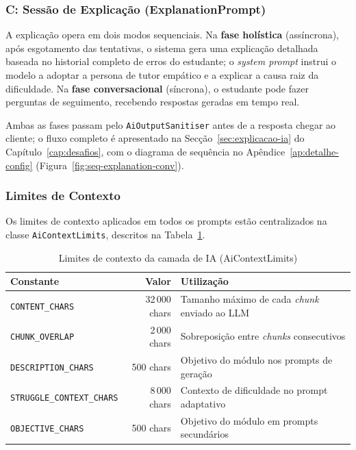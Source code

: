 \subsubsection*{C: Sessão de Explicação (ExplanationPrompt)}

A explicação opera em dois modos sequenciais.
Na \textbf{fase holística} (assíncrona), após esgotamento das tentativas, o sistema gera uma explicação detalhada baseada no historial completo de erros do estudante; o \textit{system prompt} instrui o modelo a adoptar a persona de tutor empático e a explicar a causa raiz da dificuldade.
Na \textbf{fase conversacional} (síncrona), o estudante pode fazer perguntas de seguimento, recebendo respostas geradas em tempo real.

Ambas as fases passam pelo \texttt{AiOutputSanitiser} antes de a resposta chegar ao cliente; o fluxo completo é apresentado na Secção~\ref{sec:explicacao-ia} do Capítulo~\ref{cap:desafios}, com o diagrama de sequência no Apêndice~\ref{ap:detalhe-config} (Figura~\ref{fig:seq-explanation-conv}).

\subsubsection*{Limites de Contexto}

Os limites de contexto aplicados em todos os prompts estão centralizados na classe \texttt{AiContextLimits}, descritos na Tabela~\ref{tab:context-limits}.

\begin{table}[h!]
\centering
\caption{Limites de contexto da camada de IA (AiContextLimits)}
\label{tab:context-limits}
\begin{tabular}{lrl}
\hline
\textbf{Constante} & \textbf{Valor} & \textbf{Utilização} \\
\hline
\texttt{CONTENT\_CHARS}          & 32\,000 chars & Tamanho máximo de cada \textit{chunk} enviado ao LLM \\
\texttt{CHUNK\_OVERLAP}          &  2\,000 chars & Sobreposição entre \textit{chunks} consecutivos \\
\texttt{DESCRIPTION\_CHARS}      &    500 chars  & Objetivo do módulo nos prompts de geração \\
\texttt{STRUGGLE\_CONTEXT\_CHARS} &  8\,000 chars & Contexto de dificuldade no prompt adaptativo \\
\texttt{OBJECTIVE\_CHARS}        &    500 chars  & Objetivo do módulo em prompts secundários \\
\hline
\end{tabular}
\end{table}


